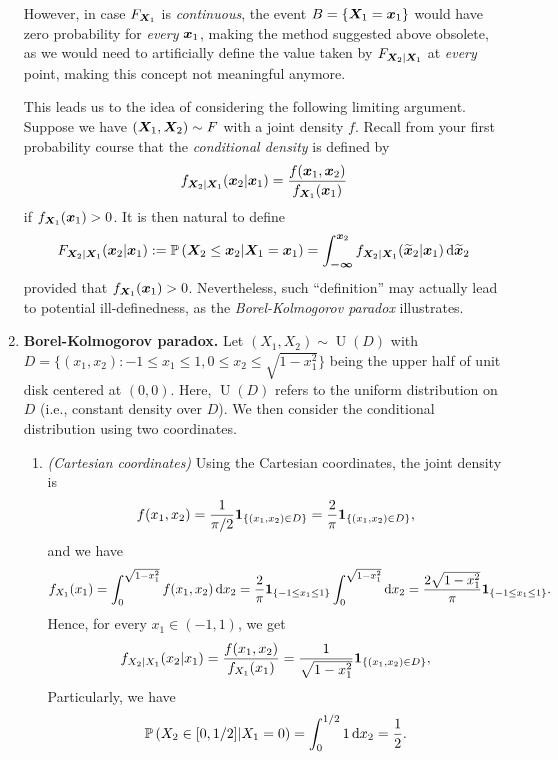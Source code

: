 \begin{enumerate}
However, in case \(F_{\bm{X}_1}\) is \emph{continuous}, the event
\(B=\{\bm{X}_1=\bm{x}_1\}\) would have zero probability for \emph{every}
\(\bm{x}_1\), making the method suggested above obsolete, as we would need to
artificially define the value taken by \(F_{\bm{X}_2|\bm{X}_1}\) at
\emph{every} point, making this concept not meaningful anymore.

This leads us to the idea of considering the following limiting argument.
Suppose we have \((\bm{X}_1,\bm{X}_2)\sim F\) with a joint density \(f\).
Recall from your first probability course that the \emph{conditional density}
is defined by
\[
f_{\bm{X}_2|\bm{X}_1}(\bm{x}_2|\bm{x}_1)
=\frac{f(\bm{x}_1,\bm{x}_2)}{f_{\bm{X}_1}(\bm{x}_1)}
\]
if \(f_{\bm{X}_1}(\bm{x}_1)>0\). It is then natural to define
\[
F_{\vect{X}_2|\vect{X}_1}(\vect{x}_2|\vect{x}_1)
:=\prob{\vect{X}_2\le\vect{x}_2|\vect{X}_1=\vect{x}_1}
=\int_{\vect{-\infty}}^{\vect{x}_2}
f_{\vect{X}_2|\vect{X}_1}(\widetilde{\vect{x}}_2|\vect{x}_1)
\odif{\widetilde{\vect{x}}_2}
\]
provided that \(f_{\bm{X}_1}(\bm{x}_1)>0\). Nevertheless, such
``definition'' may actually lead to potential ill-definedness, as the
\emph{Borel-Kolmogorov paradox} illustrates.
\item \textbf{Borel-Kolmogorov paradox.} Let
\((X_1,X_2)\sim\operatorname{U}(D)\) with \(D=\{(x_1,x_2):-1\le x_1\le 1, 0\le
x_2\le \sqrt{1-x_{1}^{2}}\}\) being the upper half of unit disk centered at
\((0,0)\). Here, \(\operatorname{U}(D)\) refers to the uniform distribution
on \(D\) (i.e., constant density over \(D\)). We then consider the conditional
distribution using two coordinates.

\begin{enumerate}
\item \emph{(Cartesian coordinates)} Using the Cartesian coordinates, the joint
density is \[f(x_1,x_2)=\frac{1}{\pi/2}\mathbf{1}_{\left\{(x_1,x_2)\in D\right\}}
=\frac{2}{\pi}\mathbf{1}_{\left\{(x_1,x_2)\in D\right\}},\] and we have
\[f_{X_1}(x_1)
=\int_{0}^{\sqrt{1-x_{1}^{2}}}f(x_1,x_2)\odif{x_2}
=\frac{2}{\pi}\indicset{-1\le x_1\le 1}\int_{0}^{\sqrt{1-x_{1}^{2}}}\odif{x_2}
=\frac{2\sqrt{1-x_{1}^{2}}}{\pi}\indicset{-1\le x_1\le 1}.
\]
Hence, for every \(x_1\in (-1,1)\), we get
\[
f_{X_2|X_1}(x_2|x_1)=\frac{f(x_1,x_2)}{f_{X_1}(x_1)}
=\frac{1}{\sqrt{1-x_{1}^{2}}}\mathbf{1}_{\left\{(x_1,x_2)\in D\right\}},
\]
Particularly, we have
\[\prob{X_2\in [0,1/2]|X_1=0}=\int_{0}^{1/2}1\odif{x_2}=\frac{1}{2}.\]


\end{enumerate}
\end{enumerate}

